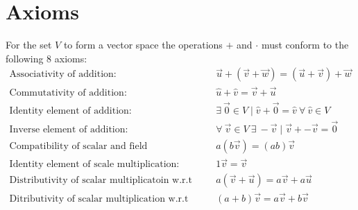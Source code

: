 \documentclass[a4paper]{article}
\begin{document}
\section{Axioms}
For the set $V$ to form a vector space the operations $+$ and $\cdot$ must conform to the following 8 axioms:
\begin{align}
  \text{Associativity of addition: } &\vec{u}+(\vec{v}+\vec{w}) = (\vec{u}+\vec{v})+\vec{w}\\
  \text{Commutativity of addition: }&\hat{u}+\hat{v} = \vec{v}+\vec{u}\\
  \text{Identity element of addition: }&\exists\:\vec{0}\in V \mid \hat{v} + \vec{0} = \hat{v} \:\forall \: \hat{v}\in V\\
  \text{Inverse element of addition: } &\forall \: \vec{v}\in V\: \exists \: -\vec{v} \mid \vec{v} + -\vec{v}=\vec{0}\\
  \text{Compatibility of scalar and field multiplication: }& a(b \vec{v}) = (ab) \vec{v}\\
  \text{Identity element of scale multiplication: }& 1 \vec{v} = \vec{v}\\
  \text{Distributivity of scalar multiplicatoin w.r.t vector addition: } &a(\vec{v}+\vec{u})= a\vec{v}+a\vec{u}\\
  \text{Ditributivity of scalar multiplication w.r.t field addition: }&(a+b)\vec{v} = a\vec{v}+b\vec{v}
\end{align}


\end{document}
